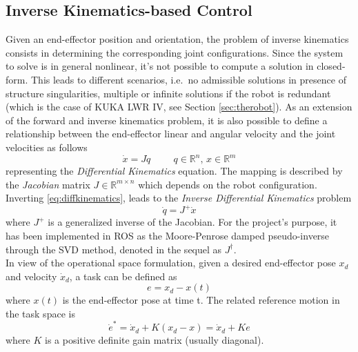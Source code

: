 \subsection{Inverse Kinematics-based Control}
Given an end-effector position and orientation, the problem of inverse kinematics consists in determining the corresponding joint configurations. Since the system to solve is in general nonlinear, it's not possible to compute a solution in closed-form. This leads to different scenarios, i.e.\ no admissible solutions in presence of structure singularities, multiple or infinite solutions if the robot is redundant (which is the case of KUKA LWR IV, see Section \ref{sec:therobot}). As an extension of the forward and inverse kinematics problem, it is also possible to define a relationship between the end-effector linear and angular velocity and the joint velocities as follows
\begin{equation}
\dot{x} = J\dot{q} \hspace{1cm} q \in \mathbb{R}^n,\,x \in \mathbb{R}^m
\label{eq:diffkinematics}
\end{equation}
representing the \textit{Differential Kinematics} equation. The mapping is described by the \textit{Jacobian} matrix $J \in \mathbb{R}^{m \times n}$ which depends on the robot configuration. Inverting \eqref{eq:diffkinematics}, leads to the \textit{Inverse Differential Kinematics} problem
\begin{equation}
\dot{q} = J^+\dot{x}
\end{equation}
where $J^+$ is a generalized inverse of the Jacobian. For the project's purpose, it has been implemented in ROS as the Moore-Penrose damped pseudo-inverse through the SVD method, denoted in the sequel as $J^{\dagger}$.\\
In view of the operational space formulation, given a desired end-effector pose $x_d$ and velocity $\dot{x}_d$, a task can be defined as 
\begin{equation}
e = x_d - x(t)
\end{equation}
where $x(t)$ is the end-effector pose at time t.
The related reference motion in the task space is
\begin{equation}
\dot{e}^* = \dot{x}_d + K(x_d - x) = \dot{x}_d + Ke
\end{equation}
where $K$ is a positive definite gain matrix (usually diagonal).

